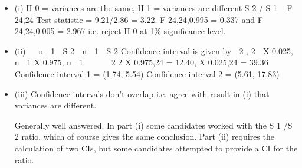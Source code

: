 \documentclass[a4paper,12pt]{article}
\begin{document}
\begin{itemize}
\item (i)
H 0 = variances are the same, H 1 = variances are different
S 2 / S 1 ~ F 24,24
Test statistic = 9.21/2.86 = 3.22.
F 24,24,0.995 = 0.337 and F 24,24,0.005 = 2.967
i.e. reject H 0 at 1\% significance level.
\item (ii)
  n  1  S 2  n  1  S 2
Confidence interval is given by  2
, 2
 X 0.025, n  1 X 0.975,
n  1





2
2
X 0.975,24
 =  12.40, X 0.025,24
 =  39.36
Confidence interval 1 = (1.74, 5.54)
Confidence interval 2 = (5.61, 17.83)
\item (iii)
Confidence intervals don’t overlap i.e. agree with result in (i) that variances
are different.

Generally well answered. In part (i) some candidates worked with the S 1 /S 2 ratio, which of course gives the same conclusion. Part (ii) requires the calculation of two CIs, but some
candidates attempted to provide a CI for the ratio.
\end{itemize}
\end{document}
